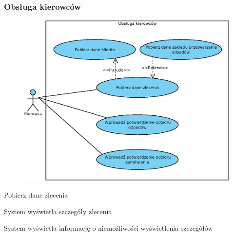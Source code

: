 \subsubsection{Obsługa kierowców}

	\begin{figure}[H]
		\centering
		\includegraphics[width=.8\textwidth]{img/UC/kierowcy.eps}
	\end{figure}

	\begin{usecase}{Pobierz dane zlecenia}
		\author{Dawid Suder}
		\maketitle
		\begin{scenario}
			\begin{enumerate}
				 System wyświetla szczegóły zlecenia
			\end{enumerate}
		\end{scenario}
		\begin{extensions}
			\begin{enumerate}
			 System wyświetla informację o niemożliwości wyświetlenia szczegółów
			\end{enumerate}
		\end{extensions}
	\end{usecase}


